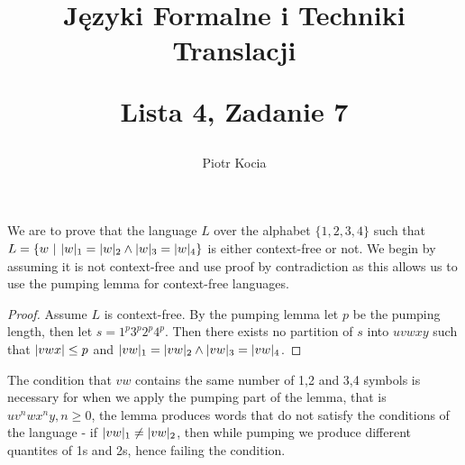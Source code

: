 \documentclass[a4paper, 12pt]{article}
\DeclarePairedDelimiter{\abs}{\lvert}{\rvert}
\begin{document}
\title{
  Języki Formalne i Techniki Translacji \\
  \vspace{0.5em}
  \begin{center}\Large Lista 4, Zadanie 7\end{center}}
\author{Piotr Kocia}
\date{}
\maketitle

We are to prove that the language $L$ over the alphabet $\{ 1, 2, 3, 4 \}$ such
that $L = \{ w \ | \ \abs{w}_1 = \abs{w}_2 \land \abs{w}_3 = \abs{w}_4 \}$ is
either context-free or not. We begin by assuming it is not context-free and use
proof by contradiction as this allows us to use the pumping lemma for
context-free languages.

\begin{proof}
Assume $L$ is context-free. By the pumping lemma let $p$ be the pumping length,
then let $s = 1^p3^p2^p4^p$. Then there exists no partition of $s$ into $uvwxy$
such that $\abs{vwx} \leq p$ and $\abs{vw}_1 = \abs{vw}_2 \land \abs{vw}_3 =
\abs{vw}_4$.
\end{proof}

The condition that $vw$ contains the same number of 1,2 and 3,4 symbols is
necessary for when we apply the pumping part of the lemma, that is $uv^nwx^ny, n
\geq 0$, the lemma produces words that do not satisfy the conditions of the
language - if $\abs{vw}_1 \neq \abs{vw}_2$, then while pumping we produce
different quantites of 1s and 2s, hence failing the condition.
\end{document}
